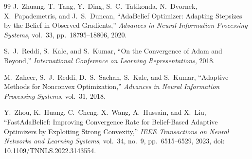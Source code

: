 \documentclass[11pt]{article}
\begin{document}
\begin{thebibliography}{99}
J.~Zhuang, T.~Tang, Y.~Ding, S.~C.~Tatikonda, N.~Dvornek, X.~Papademetris, and J.~S.~Duncan,
``AdaBelief Optimizer: Adapting Stepsizes by the Belief in Observed Gradients,''
\emph{Advances in Neural Information Processing Systems}, vol.~33, pp.~18795--18806, 2020.

S.~J.~Reddi, S.~Kale, and S.~Kumar,
``On the Convergence of Adam and Beyond,''
\emph{International Conference on Learning Representations}, 2018.

M.~Zaheer, S.~J.~Reddi, D.~S.~Sachan, S.~Kale, and S.~Kumar,
``Adaptive Methods for Nonconvex Optimization,''
\emph{Advances in Neural Information Processing Systems}, vol.~31, 2018.

Y.~Zhou, K.~Huang, C.~Cheng, X.~Wang, A.~Hussain, and X.~Liu,
``FastAdaBelief: Improving Convergence Rate for Belief-Based Adaptive Optimizers by Exploiting Strong Convexity,''
\emph{IEEE Transactions on Neural Networks and Learning Systems}, vol.~34, no.~9, pp.~6515--6529, 2023, doi: 10.1109/TNNLS.2022.3143554.
\end{thebibliography}
\end{document}
